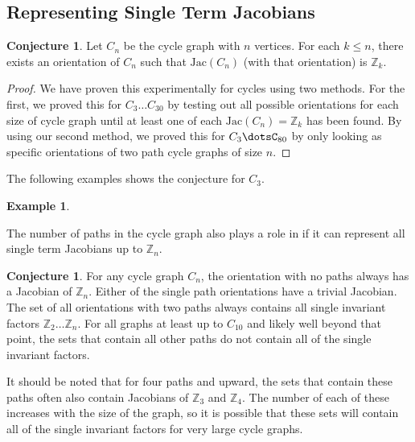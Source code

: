 \documentclass[11pt,reqno]{amsart}
\newcommand{\Jac}{\textrm{Jac}}{}
\theoremstyle{definition}
\newtheorem{myeg}[mydef]{\textbf{Example}}
\newtheorem{conj}[mydef]{\textbf{Conjecture}}
\theoremstyle{plain}
\begin{document}
	\subsection{Representing Single Term Jacobians}
		\begin{conj}
			Let $C_n$ be the cycle graph with $n$ vertices. For each $k \leq n$, there exists an orientation of $C_n$
			such that $\Jac(C_n)$ (with that orientation) is $\mathbb{Z}_k$.
		\end{conj}
		\begin{proof}
			We have proven this experimentally for cycles using two methods.  For the first, we proved this for
			$C_3 \dots C_{30}$ by testing out all possible orientations for each size of cycle graph until at least one
			of each $\Jac(C_n)=\mathbb{Z}_k$ has been found.  By using our second method, we proved this for
			$C_3\dotsC_{80}$ by only looking as specific orientations of two path cycle graphs of size $n$.
		\end{proof}

		The following examples shows the conjecture for $C_3$.

		\begin{myeg}


		\end{myeg}

		The number of paths in the cycle graph also plays a role in if it can represent all single term Jacobians up
		to $\mathbb{Z}_n$.

		\begin{conj}
			For any cycle graph $C_n$, the orientation with no paths always has a Jacobian of $\mathbb{Z}_n$.
			Either of the single path orientations have a trivial Jacobian.
			The set of all orientations with two paths always contains all single invariant factors
			$\mathbb{Z}_2\dots\mathbb{Z}_n$.  For all graphs at least up to $C_{10}$ and likely well beyond that
			point, the sets that contain all other paths do not contain all of the single invariant factors.
		\end{conj}

		It should be noted that for four paths and upward, the sets that contain these paths often also contain
		Jacobians of $\mathbb{Z}_3$ and $\mathbb{Z}_4$.  The number of each of these increases with the size of the
		graph, so it is possible that these sets will contain all of the single invariant factors for very
		large cycle graphs.
\end{document}

